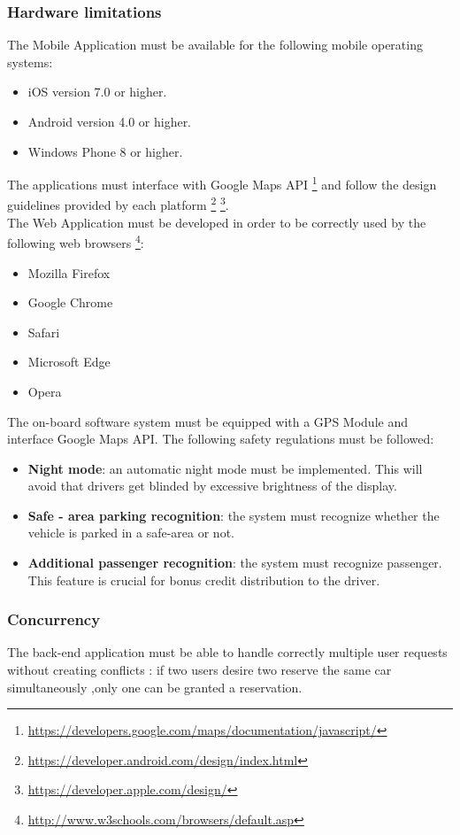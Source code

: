 \documentclass[12pt]{article}
\begin{document}
	\subsubsection{Hardware limitations}
	The Mobile Application must be available for the following mobile operating systems:
	\begin{itemize}
		\item iOS version 7.0 or higher.
		\item Android version 4.0 or higher.
		\item Windows Phone 8 or higher.
	\end{itemize}
	The applications must interface with Google Maps API \footnote{\url{https://developers.google.com/maps/documentation/javascript/}} and follow the design guidelines provided by each platform \footnote{\url{https://developer.android.com/design/index.html}} \footnote{\url{https://developer.apple.com/design/}}.\\
	\newline
	The Web Application must be developed in order to be correctly used by the following web browsers \footnote{\url{http://www.w3schools.com/browsers/default.asp}}:
		\begin{itemize}
		\item Mozilla Firefox
		\item Google Chrome
		\item Safari
		\item Microsoft Edge
		\item Opera
	\end{itemize}
	The on-board software system must be equipped with a GPS Module and interface Google Maps API. The following safety regulations must be followed:
	\begin{itemize}
		\item \textbf{Night mode}: an automatic night mode must be implemented. This will avoid that drivers get blinded by excessive brightness of the display.
		\item \textbf{Safe - area parking recognition}: the system must recognize whether the vehicle is parked in a safe-area or not.
		\item \textbf{Additional passenger recognition}: the system must recognize passenger. This feature is crucial for bonus credit distribution to the driver.
	\end{itemize}
	
	\subsubsection{Concurrency}
	The back-end application must be able to handle correctly multiple user requests without creating conflicts : if two users desire two reserve the same car simultaneously ,only one can be granted a reservation.
	
\end{document}
